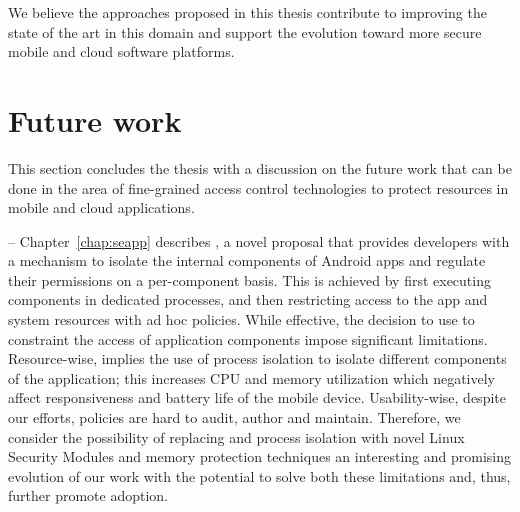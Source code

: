 We believe the approaches proposed in this thesis contribute to
improving the state of the art in this domain and support the
evolution toward more secure mobile and cloud software platforms.

\section{Future work}

This section concludes the thesis with a discussion on the future work
that can be done in the area of fine-grained access control
technologies to protect resources in mobile and cloud applications.

 -- Chapter~\ref{chap:seapp}
describes \seapp, a novel proposal that provides developers with a
mechanism to isolate the internal components of Android apps and
regulate their permissions on a per-component basis. This is
achieved by first executing components in dedicated processes, and
then restricting access to the app and system resources with ad hoc
\sel policies. While effective, the decision to use \sel to constraint
the access of application components impose significant limitations.
Resource-wise, \sel implies the use of process isolation to isolate
different components of the application; this increases CPU and memory
utilization which negatively affect responsiveness and battery life of
the mobile device. Usability-wise, despite our efforts, \sel policies
are hard to audit, author and maintain. Therefore, we consider the
possibility of replacing \sel and process isolation with novel Linux
Security Modules and memory protection techniques an interesting and
promising evolution of our work with the potential to solve both these
limitations and, thus, further promote adoption.

